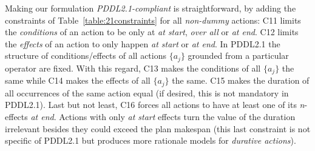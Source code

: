 \documentclass{ecai}
\begin{document}
Making our formulation {\em PDDL2.1-compliant} is straightforward, by adding the constraints of Table~\ref{table:21constraints} for all {\em non-dummy} actions: C11 limits the {\em conditions} of an action to be only at \emph{at start}, \emph{over all} or \emph{at end}. C12 limits the {\em effects} of an action to only happen \emph{at start} or \emph{at end}. In PDDL2.1 the structure of conditions/effects of all actions $\{a_j\}$ grounded from a particular operator are fixed. With this regard, C13 makes the conditions of all $\{a_j\}$ the same while C14 makes the effects of all $\{a_j\}$ the same. C15 makes the duration of all occurrences of the same action equal (if desired, this is not mandatory in PDDL2.1). Last but not least, C16 forces all actions to have at least one of its \textit{n}-effects \textit{at end}. Actions with only \textit{at start} effects turn the value of the duration irrelevant besides they could exceed the plan makespan (this last constraint is not specific of PDDL2.1 but produces more rationale models for {\em durative actions}).
\end{document}
